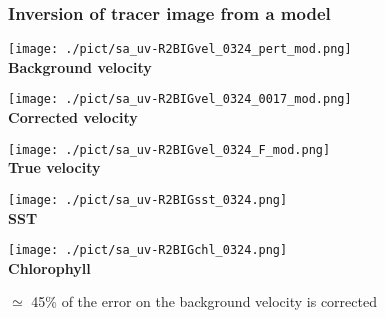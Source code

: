 \documentclass[compress,slidescentered,notes=show]{beamer}
\begin{document}
\begin{frame}
  \frametitle{Inversion of tracer image from a model}
\begin{minipage}{0.3\textwidth}
\begin{center}
\texttt{[image: ./pict/sa\_uv-R2BIGvel\_0324\_pert\_mod.png]}\\
{\small \bf Background velocity}
\end{center}
\end{minipage}
\begin{minipage}{0.3\textwidth}
\begin{center}
\texttt{[image: ./pict/sa\_uv-R2BIGvel\_0324\_0017\_mod.png]}\\
{\small \bf Corrected velocity}
\end{center}
\end{minipage}
\begin{minipage}{0.3\textwidth}
\begin{center}
\texttt{[image: ./pict/sa\_uv-R2BIGvel\_0324\_F\_mod.png]}\\

{\small \bf True velocity}
\end{center}
\end{minipage}
\begin{minipage}{0.34\textwidth}
\begin{center}
\texttt{[image: ./pict/sa\_uv-R2BIGsst\_0324.png]}\\
{\small \bf SST}
\end{center}
\end{minipage}
\begin{minipage}{0.34\textwidth}
\begin{center}
\texttt{[image: ./pict/sa\_uv-R2BIGchl\_0324.png]}\\
{\small \bf Chlorophyll}
\end{center}
\end{minipage}
\begin{minipage}{0.3\textwidth}
\begin{block}{}
$\simeq$ 45\% of the error on the background velocity is corrected
\end{block}
\end{minipage}

\end{frame}
\end{document}
